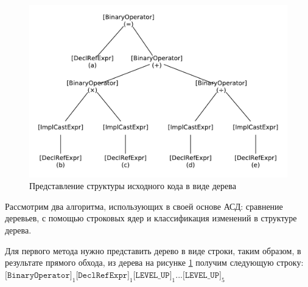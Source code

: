 \begin{figure}[h!btp]
	\centering
	\includegraphics[width=\textwidth]{inc/ast-ex.pdf}
	\caption{Представление структуры исходного кода в виде дерева}
	\label{fig:ast-ex}	
\end{figure}

Рассмотрим два алгоритма, использующих в своей основе АСД: сравнение деревьев, с помощью строковых ядер\cite{string-kernel}\cite{ast-aproach} и классификация изменений в структуре дерева\cite{ast-op-values}.

Для первого метода нужно представить дерево в виде строки, таким образом, в результате прямого обхода, из дерева на рисунке \ref{fig:ast-ex} получим следующую строку: 
$
\texttt{[BinaryOperator]}_1\texttt{[DeclRefExpr]}_1\texttt{[LEVEL\_UP]}_1...\texttt{[LEVEL\_UP]}_5
$


